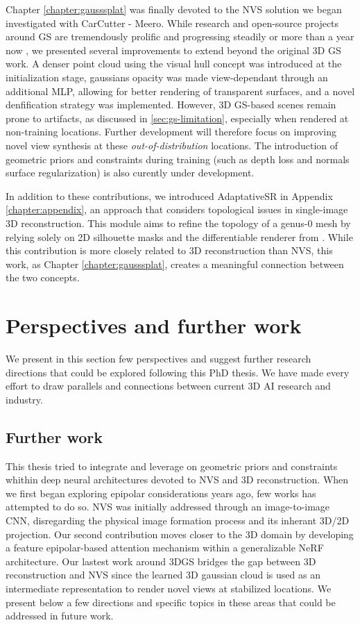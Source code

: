 Chapter \ref{chapter:gausssplat} was finally devoted to the \ac{NVS} solution we began investigated with CarCutter - Meero.  While research and open-source projects around \ac{GS} \citep{kerbl20233d} are tremendously prolific and progressing steadily or more than a year now \citep{luiten2023dynamic,yang2024gaussianobject,wewer24latentsplat}, we presented several improvements to extend beyond the original 3D \ac{GS} work. A denser point cloud using the visual hull concept was introduced at the initialization stage, gaussians opacity was made view-dependant through an additional \ac{MLP}, allowing for better rendering of transparent surfaces, and a novel denfification strategy was implemented. However, 3D \ac{GS}-based scenes remain prone to artifacts, as discussed in \ref{sec:gs-limitation}, especially when rendered at non-training locations. Further development will therefore focus on improving novel view synthesis at these \textit{out-of-distribution} locations. The introduction of geometric priors and constraints during training (such as depth loss and normals surface regularization) is also curently under development. 

In addition to these contributions, we introduced AdaptativeSR in Appendix \ref{chapter:appendix}, an approach that considers topological issues in single-image 3D reconstruction. This module aims to refine the topology of a genus-0 mesh by relying solely on 2D silhouette masks and the differentiable renderer from \citep{liu2019soft}. While this contribution is more closely related to 3D reconstruction than \ac{NVS}, this work, as Chapter \ref{chapter:gausssplat}, creates a meaningful connection between the two concepts. 

\section{Perspectives and further work}
We present in this section few perspectives and suggest further research directions that could be explored following this PhD thesis. We have made every effort to draw parallels and connections between current 3D \ac{AI} research and industry. 

\subsection{Further work}
This thesis tried to integrate and leverage on geometric priors and constraints whithin deep neural architectures devoted to \ac{NVS} and 3D reconstruction. When we first began exploring epipolar considerations years ago, few works has attempted to do so. \ac{NVS} was initially addressed through an image-to-image \ac{CNN}, disregarding the physical image formation process and its inherant 3D/2D projection. Our second contribution moves closer to the 3D domain by developing a feature epipolar-based attention mechanism within a generalizable \ac{NeRF} architecture. Our lastest work around 3D\ac{GS} bridges the gap between 3D reconstruction and \ac{NVS} since the learned 3D gaussian cloud is used as an intermediate representation to render novel views at stabilized locations. We present below a few directions and specific topics in these areas that could be addressed in future work.

